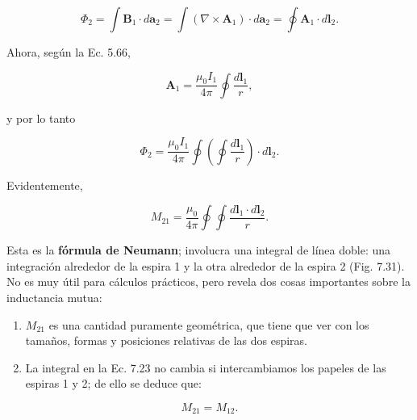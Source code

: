 \documentclass[12pt,a4paper]{report}
\newcommand{\esp}{\vspace{0.5cm}}
\begin{document}
	\esp
	
	\begin{equation}
		\Phi_2 = \int \mathbf{B}_1 \cdot d\mathbf{a}_2 = \int (\nabla \times \mathbf{A}_1) \cdot d\mathbf{a}_2 = \oint \mathbf{A}_1 \cdot d\mathbf{l}_2.
	\end{equation}
	
	\esp
	
	\noindent Ahora, según la Ec. 5.66,
	
	\esp
	
	\begin{equation}
		\mathbf{A}_1 = \frac{\mu_0 I_1}{4\pi} \oint \frac{d\mathbf{l}_1}{r},
	\end{equation}
	
	\esp
	
	\noindent y por lo tanto
	
	\esp
	
	\begin{equation}
		\Phi_2 = \frac{\mu_0 I_1}{4\pi} \oint \left( \oint \frac{d\mathbf{l}_1}{r} \right) \cdot d\mathbf{l}_2.
	\end{equation}
	
	\esp
	
	\noindent Evidentemente,
	
	\esp
	
	\begin{equation}
		M_{21} = \frac{\mu_0}{4\pi} \oint \oint \frac{d\mathbf{l}_1 \cdot d\mathbf{l}_2}{r}. \tag{7.23}
	\end{equation}

	\esp
	
	Esta es la \textbf{fórmula de Neumann}; involucra una integral de línea doble: una integración alrededor de la espira 1 y la otra alrededor de la espira 2 (Fig. 7.31). No es muy útil para cálculos prácticos, pero revela dos cosas importantes sobre la inductancia mutua:
	
	\esp
	
	\begin{enumerate}
		\item $M_{21}$ es una cantidad puramente geométrica, que tiene que ver con los tamaños, formas y posiciones relativas de las dos espiras.
		\item La integral en la Ec. 7.23 no cambia si intercambiamos los papeles de las espiras 1 y 2; de ello se deduce que:
	\end{enumerate}
	
	\esp
	
	\begin{equation}
		M_{21} = M_{12}. \tag{7.24}
	\end{equation}
	
\end{document}
